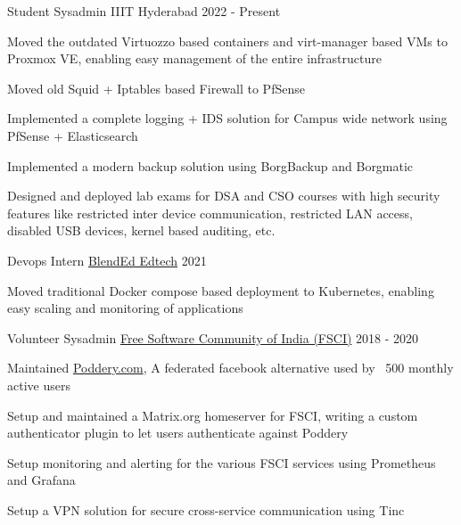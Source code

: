 
\begin{cventries}
  \cventry
    {Student Sysadmin} %
    {IIIT Hyderabad} %
    {} %
    {2022 - Present} %
    {
      \begin{cvitems} %
        \item {Moved the outdated Virtuozzo based containers and virt-manager based VMs to Proxmox VE, enabling easy management of the entire infrastructure}
        \item {Moved old Squid + Iptables based Firewall to PfSense}
        \item {Implemented a complete logging + IDS solution for Campus wide network using PfSense + Elasticsearch}
        \item {Implemented a modern backup solution using BorgBackup and Borgmatic}
        \item {Designed and deployed lab exams for DSA and CSO courses with high security features like restricted inter device communication, restricted LAN access, disabled USB devices, kernel based auditing, etc.}
      \end{cvitems}
    }

  \cventry
    {Devops Intern} %
    {\href{https://blend-ed.org/}{BlendEd Edtech}} %
    {} %
    {2021} %
    {
      \begin{cvitems} %
        \item {Moved traditional Docker compose based deployment to Kubernetes, enabling easy scaling and monitoring of applications}
      \end{cvitems}
    }

    \cventry
    {Volunteer Sysadmin} %
    {\href{https://fsci.in}{Free Software Community of India (FSCI)}} %
    {} %
    {2018 - 2020} %
    {
      \begin{cvitems} %
        \item {Maintained \href{https://poddery.com}{Poddery.com}, A federated facebook alternative used by ~500 monthly active users}
        \item {Setup and maintained a Matrix.org homeserver for FSCI, writing a custom authenticator plugin to let users authenticate against Poddery}
        \item {Setup monitoring and alerting for the various FSCI services using Prometheus and Grafana}
        \item {Setup a VPN solution for secure cross-service communication using Tinc}
      \end{cvitems}
    }
\end{cventries}
